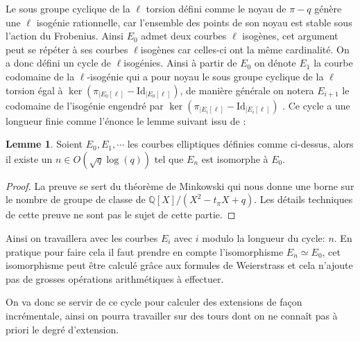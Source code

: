 \documentclass[10pt,a4paper]{book}
\theoremstyle{plain}
\theoremstyle{definition}
\newtheorem{lem}[thm]{Lemme}
\theoremstyle{definition}
\theoremstyle{definition}
\theoremstyle{definition}
\theoremstyle{remark}
\theoremstyle{remark}
\begin{document}
Le sous groupe cyclique de la $\ell$ torsion défini comme le noyau de $\pi -q$ génère une $\ell$ isogénie rationnelle, car l'ensemble des points de son noyau est stable sous l'action du Frobenius. Ainsi $E_0$ admet deux courbes $\ell$ isogènes, cet argument peut se répéter à ses courbes $\ell$isogènes car celles-ci ont la même cardinalité. On a donc défini un cycle de $\ell$isogénies. Ainsi à partir de $E_0$ on dénote $E_1$ la courbe codomaine de la $\ell$-isogénie qui a pour noyau le sous groupe cyclique de la $\ell$ torsion égal à $\ker (\pi_{|E_0[\ell]} - \mathrm{Id}_{|E_0[\ell]})$, de manière générale on notera $E_{i+1}$ le codomaine de l'isogénie engendré par $\ker (\pi_{|E_i[\ell]} - \mathrm{Id}_{|E_i[\ell]})$ . Ce cycle a une longueur finie comme l'énonce le lemme suivant issu de \cite{DeFeo-Doliskani-Schost13}:

\begin{lem}
Soient $E_0,E_1, \cdots$ les courbes elliptiques définies comme ci-dessus, alors il existe un $n \in O(\sqrt{q}\log(q))$ tel que $E_n$ est isomorphe à $E_0$.
\end{lem}

\begin{proof}
La preuve se sert du théorème de Minkowski qui nous donne une borne sur le nombre de groupe de classe de $\mathbb{Q}[X]/(X^2-t_{\pi}X+q)$. Les détails techniques de cette preuve ne sont pas le sujet de cette partie.
\end{proof}

Ainsi on travaillera avec les courbes $E_i$ avec $i$ modulo la longueur du cycle: $n$. En pratique pour faire cela il faut prendre en compte l'isomorphisme $E_n \simeq E_0$, cet isomorphisme peut être calculé grâce aux formules de Weierstrass et cela n'ajoute pas de grosses opérations arithmétiques à effectuer.

On va donc se servir de ce cycle pour calculer des extensions de façon incrémentale, ainsi on pourra travailler sur des tours dont on ne connaît pas à priori le degré d'extension. 
\end{document}
